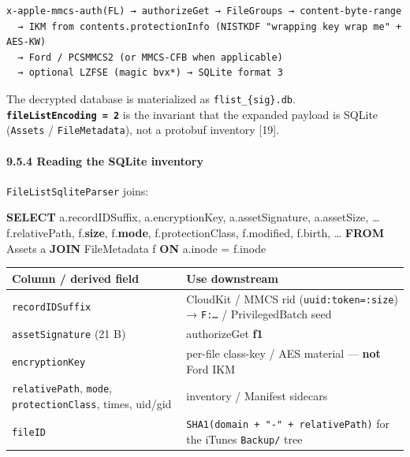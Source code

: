 \documentclass[
  english,
  10pt]{article}
\newenvironment{Shaded}{}{}
\newcommand{\KeywordTok}[1]{\textcolor[rgb]{0.00,0.44,0.13}{\textbf{#1}}}
\newcommand{\NormalTok}[1]{#1}
\newcommand{\OperatorTok}[1]{\textcolor[rgb]{0.40,0.40,0.40}{#1}}
\newcounter{none} %
\begin{document}
\begin{verbatim}
x-apple-mmcs-auth(FL) → authorizeGet → FileGroups → content-byte-range
  → IKM from contents.protectionInfo (NISTKDF "wrapping key wrap me" + AES-KW)
  → Ford / PCSMMCS2 (or MMCS-CFB when applicable)
  → optional LZFSE (magic bvx*) → SQLite format 3
\end{verbatim}

The decrypted database is materialized as \texttt{flist\_\{sig\}.db}.
\textbf{\texttt{fileListEncoding\ =\ 2}} is the invariant that the
expanded payload is SQLite (\texttt{Assets} / \texttt{FileMetadata}),
not a protobuf inventory {[}19{]}.

\paragraph{9.5.4 Reading the SQLite
inventory}\label{reading-the-sqlite-inventory}

\texttt{FileListSqliteParser} joins:

\begin{Shaded}
\begin{Highlighting}[]
\KeywordTok{SELECT}\NormalTok{ a.recordIDSuffix, a.encryptionKey, a.assetSignature, a.assetSize, …}
\NormalTok{       f.relativePath, f.}\KeywordTok{size}\NormalTok{, f.}\KeywordTok{mode}\NormalTok{, f.protectionClass, f.modified, f.birth, …}
\KeywordTok{FROM}\NormalTok{ Assets a}
\KeywordTok{JOIN}\NormalTok{ FileMetadata f }\KeywordTok{ON}\NormalTok{ a.inode }\OperatorTok{=}\NormalTok{ f.inode}
\end{Highlighting}
\end{Shaded}

{\def\LTcaptype{none} %
\begin{longtable}[]{@{}
  >{\raggedright\arraybackslash}p{}
  >{\raggedright\arraybackslash}p{}@{}}
\toprule\noalign{}
\begin{minipage}[b]{\linewidth}\raggedright
Column / derived field
\end{minipage} & \begin{minipage}[b]{\linewidth}\raggedright
Use downstream
\end{minipage} \\
\midrule\noalign{}
\endhead
\bottomrule\noalign{}
\endlastfoot
\texttt{recordIDSuffix} & CloudKit / MMCS rid
(\texttt{uuid:token=:size}) → \texttt{F:…} / PrivilegedBatch seed \\
\texttt{assetSignature} (21 B) & authorizeGet \textbf{f1} \\
\texttt{encryptionKey} & per-file class-key / AES material ---
\textbf{not} Ford IKM \\
\texttt{relativePath}, \texttt{mode}, \texttt{protectionClass}, times,
uid/gid & inventory / Manifest sidecars \\
\texttt{fileID} & \texttt{SHA1(domain\ +\ "-"\ +\ relativePath)} for the
iTunes \texttt{Backup/} tree \\
\end{longtable}
}
\end{document}
